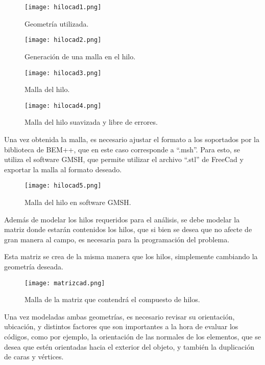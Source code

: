 \documentclass[12pt,letterpaper]{article}
\numberwithin{equation}{section}
\begin{document}
\begin{figure}[H]
	\centering\texttt{[image: hilocad1.png]}
	\caption{Geometría utilizada.}
\end{figure}

\begin{figure}[H]
	\centering\texttt{[image: hilocad2.png]}
	\caption{Generación de una malla en el hilo.}
\end{figure}

\begin{figure}[H]
	\centering\texttt{[image: hilocad3.png]}
	\caption{Malla del hilo.}
\end{figure}

\begin{figure}[H]
	\centering\texttt{[image: hilocad4.png]}
	\caption{Malla del hilo suavizada y libre de errores.}
\end{figure}

Una vez obtenida la malla, es necesario ajustar el formato a los soportados por la biblioteca de BEM++, que en este caso corresponde a ``.msh''. Para esto, se utiliza el software GMSH, que permite utilizar el archivo ``.stl'' de FreeCad y exportar la malla al formato deseado.

\begin{figure}[H]
	\centering\texttt{[image: hilocad5.png]}
	\caption{Malla del hilo en software GMSH.}
\end{figure}

Además de modelar los hilos requeridos para el análisis, se debe modelar la matriz donde estarán contenidos los hilos, que si bien se desea que no afecte de gran manera al campo, es necesaria para la programación del problema.

Esta matriz se crea de la misma manera que los hilos, simplemente cambiando la geometría deseada.

\begin{figure}[H]
	\centering\texttt{[image: matrizcad.png]}
	\caption{Malla de la matriz que contendrá el compuesto de hilos.}
\end{figure}

Una vez modeladas ambas geometrías, es necesario revisar su orientación, ubicación, y distintos factores que son importantes a la hora de evaluar los códigos, como por ejemplo, la orientación de las normales de los elementos, que se desea que estén orientadas hacia el exterior del objeto, y también la duplicación de caras y vértices.
\end{document}
